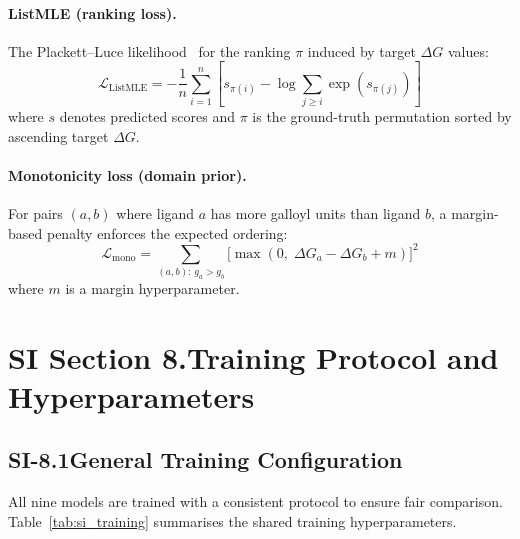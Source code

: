 \documentclass[11pt]{article}
\begin{document}
\paragraph{ListMLE (ranking loss).}
The Plackett--Luce likelihood~\cite{xia2008listwise} for the ranking
$\pi$ induced by target $\Delta G$ values:
\begin{equation}
  \mathcal{L}_{\mathrm{ListMLE}} = -\frac{1}{n}
  \sum_{i=1}^{n} \left[
    s_{\pi(i)} - \log \sum_{j \geq i}
    \exp(s_{\pi(j)})
  \right]
  \label{eq:listmle}
\end{equation}
where $s$ denotes predicted scores and $\pi$ is the ground-truth
permutation sorted by ascending target $\Delta G$.

\paragraph{Monotonicity loss (domain prior).}
For pairs $(a, b)$ where ligand $a$ has more galloyl units than ligand $b$,
a margin-based penalty enforces the expected ordering:
\begin{equation}
  \mathcal{L}_{\mathrm{mono}} = \sum_{(a,b):\, g_a > g_b}
  \bigl[\max(0,\; \Delta G_a - \Delta G_b + m)\bigr]^2
  \label{eq:mono}
\end{equation}
where $m$ is a margin hyperparameter.

\section*{SI Section 8.\quad Training Protocol and Hyperparameters}
\label{si:training}

\subsection*{SI-8.1\quad General Training Configuration}

All nine models are trained with a consistent protocol to ensure fair
comparison.
Table~\ref{tab:si_training} summarises the shared training hyperparameters.
\end{document}
